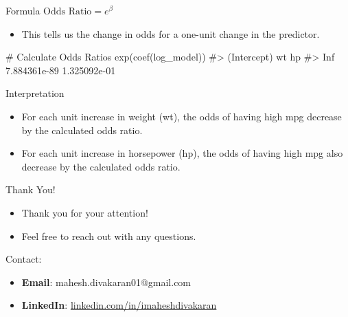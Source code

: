 \documentclass[
  18 pt,
  ignorenonframetext,
  aspectratio=1610,
]{beamer}
\newenvironment{Shaded}{\begin{snugshade}}{\end{snugshade}}
\newcommand{\CommentTok}[1]{\textcolor[rgb]{0.37,0.37,0.37}{#1}}
\newcommand{\FunctionTok}[1]{\textcolor[rgb]{0.28,0.35,0.67}{#1}}
\newcommand{\NormalTok}[1]{\textcolor[rgb]{0.00,0.23,0.31}{#1}}
\providecommand{\tightlist}{%
  \setlength{\itemsep}{0pt}\setlength{\parskip}{0pt}}\usepackage{longtable,booktabs,array}
\begin{document}
\begin{frame}[fragile]{Formula}
\protect\hypertarget{formula-3}{}
\(\text{Odds Ratio} = e^{\beta}\)

\begin{itemize}
\tightlist
\item
  This tells us the change in odds for a one-unit change in the
  predictor.
\end{itemize}

\begin{Shaded}
\begin{Highlighting}[]
\CommentTok{\# Calculate Odds Ratios}
\FunctionTok{exp}\NormalTok{(}\FunctionTok{coef}\NormalTok{(log\_model))}
\CommentTok{\#\textgreater{}  (Intercept)           wt           hp }
\CommentTok{\#\textgreater{}          Inf 7.884361e{-}89 1.325092e{-}01}
\end{Highlighting}
\end{Shaded}

\begin{block}{Interpretation}
\protect\hypertarget{interpretation-13}{}
\begin{itemize}
\tightlist
\item
  For each unit increase in weight (wt), the odds of having high mpg
  decrease by the calculated odds ratio.
\item
  For each unit increase in horsepower (hp), the odds of having high mpg
  also decrease by the calculated odds ratio.
\end{itemize}
\end{block}
\end{frame}

\begin{frame}{Thank You!}
\protect\hypertarget{thank-you}{}
\begin{itemize}
\tightlist
\item
  Thank you for your attention!
\item
  Feel free to reach out with any questions.
\end{itemize}

\begin{block}{Contact:}
\protect\hypertarget{contact}{}
\begin{itemize}
\tightlist
\item
  \textbf{Email}: mahesh.divakaran01@gmail.com
\item
  \textbf{LinkedIn}:
  \href{https://www.linkedin.com/in/imaheshdivakaran}{linkedin.com/in/imaheshdivakaran}
\end{itemize}
\end{block}
\end{frame}
\end{document}
